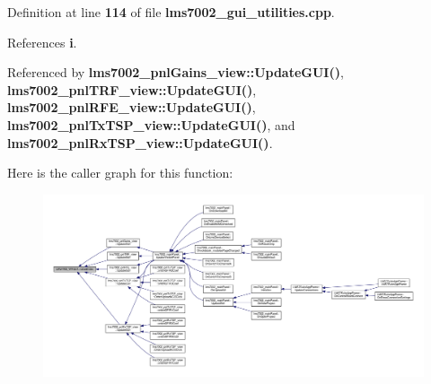 Definition at line {\bf 114} of file {\bf lms7002\+\_\+gui\+\_\+utilities.\+cpp}.



References {\bf i}.



Referenced by {\bf lms7002\+\_\+pnl\+Gains\+\_\+view\+::\+Update\+G\+U\+I()}, {\bf lms7002\+\_\+pnl\+T\+R\+F\+\_\+view\+::\+Update\+G\+U\+I()}, {\bf lms7002\+\_\+pnl\+R\+F\+E\+\_\+view\+::\+Update\+G\+U\+I()}, {\bf lms7002\+\_\+pnl\+Tx\+T\+S\+P\+\_\+view\+::\+Update\+G\+U\+I()}, and {\bf lms7002\+\_\+pnl\+Rx\+T\+S\+P\+\_\+view\+::\+Update\+G\+U\+I()}.



Here is the caller graph for this function\+:
\nopagebreak
\begin{figure}[H]
\begin{center}
\leavevmode
\includegraphics[width=350pt]{de/df1/namespaceLMS7002__WXGUI_a596ebf9c5660fcde44fa5d24af15b18c_icgraph}
\end{center}
\end{figure}



